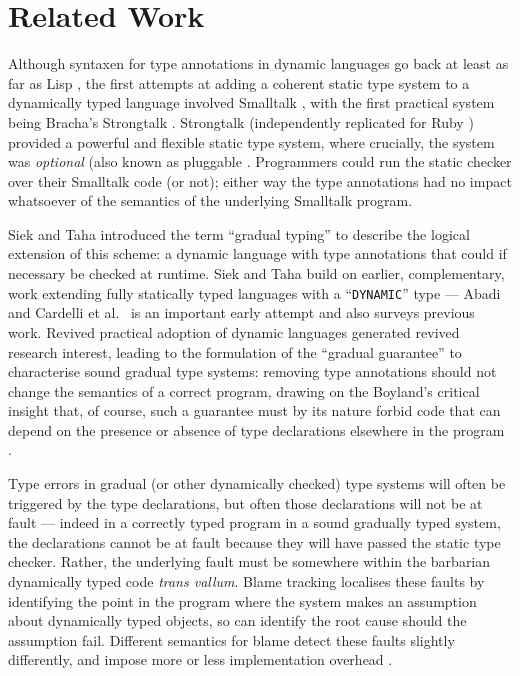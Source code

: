 
\section{Related Work}
\label{sec:related-work}

Although syntaxen for type annotations in dynamic languages go back at
least as far as Lisp \cite{cltl2}, the first attempts at adding a
coherent static type system to a dynamically typed language involved
Smalltalk \cite{RalphJohnson1986}, with the first practical system
being Bracha's Strongtalk \cite{strongtalk}. Strongtalk
(independently replicated for Ruby \cite{DBRuby09}) provided a
powerful and flexible static type system, where crucially, the system
was \emph{optional} (also known as pluggable
\cite{GiladPluggable2004}. Programmers could run the static checker
over their Smalltalk code (or not); either way the type annotations
had no impact whatsoever of the semantics of the underlying Smalltalk
program.

Siek and Taha introduced the term ``gradual typing''
\cite{Siek2006} to describe the logical extension of this scheme: a
dynamic language with type annotations that could if necessary be
checked at runtime. Siek and Taha build on earlier, complementary,
work extending fully statically typed languages with a ``\texttt{DYNAMIC}''
type --- Abadi and Cardelli et al.\ \cite{AbadiTOPLAS1991} is an
important early attempt
and also surveys previous work. Revived practical adoption of dynamic
languages generated revived research interest, leading to the
formulation of the ``gradual guarantee''
\cite{Siek2006,Siek2015} to characterise sound
gradual type systems: removing type annotations should not change the
semantics of a correct program, drawing on the Boyland's critical
insight that, of course, such a guarantee must by its nature forbid
code that can depend on the presence or absence of type declarations 
elsewhere in the program \cite{Boyland2014}. 

Type errors in gradual (or other dynamically checked) type systems will
often be triggered by the type declarations, but often those
declarations will not be at fault --- indeed in a correctly typed
program in a sound gradually typed system,  the declarations cannot be
at fault because they will have passed the static type
checker. Rather, the underlying fault must be somewhere within the
barbarian dynamically typed code \emph{trans vallum}.  Blame tracking
\cite{blame2009,blameThreesomes2010,blameForAll2011} localises these
faults by identifying 
the point in the program where the system makes an 
assumption about dynamically typed objects, so can identify the root
cause should the assumption fail.  Different semantics for blame
detect these faults slightly differently, and impose more or less
implementation overhead \cite{reticPython2014,monotonic2015,Vitousek2017}.

